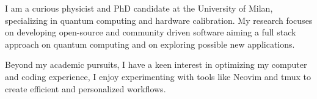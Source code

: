 \documentclass[9pt]{developercv} %
\begin{document}
\vspace{0.5cm} %



I am a curious physicist and PhD candidate at the University of Milan, 
specializing in quantum computing and hardware calibration.
My research focuses on developing open-source and community driven software aiming
a full stack approach on quantum computing and on exploring possible new applications.  

Beyond my academic pursuits, I have a keen interest in optimizing my computer and
coding experience, I enjoy experimenting with tools like Neovim and tmux to 
create efficient and personalized workflows. 

	
	
\end{document}
